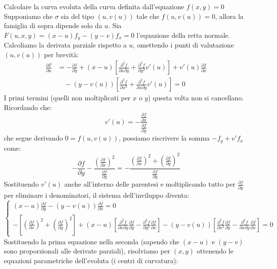 \documentclass[a4paper]{article}
\begin{document}
\begin{snippetexercise}{
    Calcolare la curva evoluta della curva definita dall'equazione \(f(x,y) = 0\)
}
    Supponiamo che \(\sigma\) sia del tipo \((u, v(u))\) tale che \(f(u, v(u)) = 0\),
    allora la famiglia di sopra dipende solo da \(u\). Sia \(F(u, x, y) = (x-u)f_y - (y-v)f_x = 0\) l'equazione della retta normale.
    Calcoliamo la derivata parziale rispetto a \(u\), omettendo i punti di valutazione \((u, v(u))\) per brevità:
    \begin{align*}
        \frac{\partial F}{\partial u} &=
        - \frac{\partial f}{\partial y}
        + (x-u)\left[
            \frac{\partial^2 f}{\partial x \partial y} + \frac{\partial^2 f}{\partial y^2} v'(u)
        \right]
        + v'(u) \frac{\partial f}{\partial x} \\
        & \quad - (y-v(u)) \left[
            \frac{\partial^2 f}{\partial x^2} + \frac{\partial^2 f}{\partial x\partial y} v'(u)
        \right] = 0
    \end{align*}
    I primi termini (quelli non moltiplicati per \(x\) o \(y\)) questa volta non si cancellano. Ricordando che:
    \[
        v'(u) = - \frac{
            \frac{\partial f}{\partial x}
        }{
            \frac{\partial f}{\partial y}
        }
    \]
    che segue derivando \(0 = f(u, v(u))\), possiamo riscrivere la somma \(-f_y + v'f_x\) come:
    \[
        - \frac{\partial f}{\partial y} - \frac{\left(\frac{\partial f}{\partial x}\right)^2}{\frac{\partial f}{\partial y}} 
        = - \frac{\left(\frac{\partial f}{\partial x}\right)^2 + \left(\frac{\partial f}{\partial y}\right)^2}{\frac{\partial f}{\partial y}}
    \]
    Sostituendo \(v'(u)\) anche all'interno delle parentesi e moltiplicando tutto per \(\frac{\partial f}{\partial y}\) per eliminare i denominatori, il sistema dell'inviluppo diventa:
    \[
        \begin{cases}
            (x-u) \frac{\partial f}{\partial y} - (y-v(u)) \frac{\partial f}{\partial x} = 0 \\[10pt]
            -\left[ \left(\frac{\partial f}{\partial x}\right)^2 + \left(\frac{\partial f}{\partial y}\right)^2 \right] 
            + (x-u) \left[ \frac{\partial^2 f}{\partial x \partial y} \frac{\partial f}{\partial y} - \frac{\partial^2 f}{\partial y^2} \frac{\partial f}{\partial x} \right] 
            - (y-v(u)) \left[ \frac{\partial^2 f}{\partial x^2} \frac{\partial f}{\partial y} - \frac{\partial^2 f}{\partial x \partial y} \frac{\partial f}{\partial x} \right] = 0
        \end{cases}
    \]
    Sostituendo la prima equazione nella seconda (sapendo che \((x-u)\) e \((y-v)\) sono proporzionali alle derivate parziali), risolviamo per \((x, y)\) ottenendo le equazioni parametriche dell'evoluta (i centri di curvatura):

\end{snippetexercise}
\end{document}
